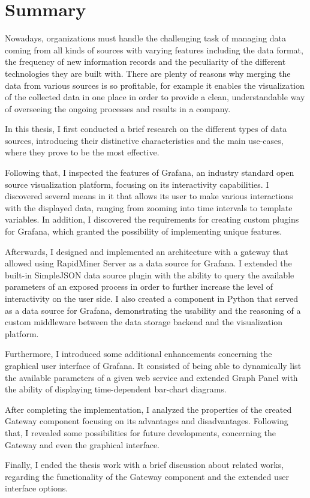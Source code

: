 \chapter{Summary}

Nowadays, organizations must handle the challenging task of managing data coming from all kinds of sources with varying features including the data format, the frequency of new information records and the peculiarity of the different technologies they are built with. There are plenty of reasons why merging the data from various sources is so profitable, for example it enables the visualization of the collected data in one place in order to provide a clean, understandable way of overseeing the ongoing processes and results in a company.

In this thesis, I first conducted a brief research on the different types of data sources, introducing their distinctive characteristics and the main use-cases, where they prove to be the most effective.

Following that, I inspected the features of Grafana, an industry standard open source visualization platform, focusing on its interactivity capabilities. I discovered several means in it that allows its user to make various interactions with the displayed data, ranging from zooming into time intervals to template variables. In addition, I discovered the requirements for creating custom plugins for Grafana, which granted the possibility of implementing unique features.

Afterwards, I designed and implemented an architecture with a gateway that allowed using RapidMiner Server as a data source for Grafana. I extended the built-in SimpleJSON data source plugin with the ability to query the available parameters of an exposed process in order to further increase the level of interactivity on the user side. I also created a component in Python that served as a data source for Grafana, demonstrating the usability and the reasoning of a custom middleware between the data storage backend and the visualization platform.

Furthermore, I introduced some additional enhancements concerning the graphical user interface of Grafana. It consisted of being able to dynamically list the available parameters of a given web service and extended Graph Panel with the ability of displaying time-dependent bar-chart diagrams.

After completing the implementation, I analyzed the properties of the created Gateway component focusing on its advantages and disadvantages. Following that, I revealed some possibilities for future developments, concerning the Gateway and even the graphical interface.

Finally, I ended the thesis work with a brief discussion about related works, regarding the functionality of the Gateway component and the extended user interface options.


